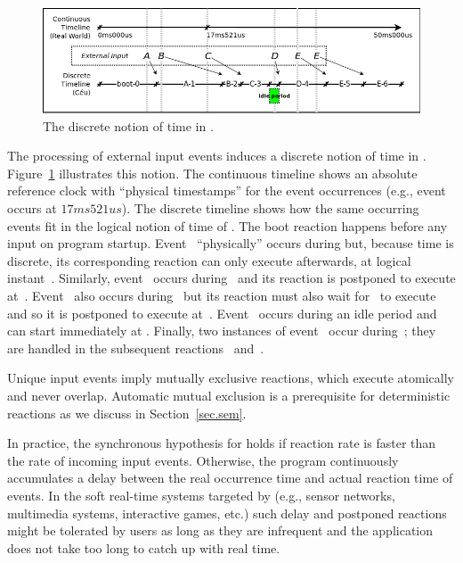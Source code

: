 \begin{figure}[b]
\centering
\includegraphics[width=\columnwidth]{tick}
\caption{The discrete notion of time in \CEU.}
\label{fig.ticks}
\end{figure}

The processing of external input events induces a discrete notion of time in
\CEU.
%
Figure~\ref{fig.ticks} illustrates this notion.
%
The continuous timeline shows an absolute reference clock with ``physical
timestamps'' for the event occurrences (e.g., event~ occurs at
$17ms521us$).
%
The discrete timeline shows how the same occurring events fit in the logical
notion of time of \CEU.
%
The boot reaction  happens before any input on program startup.
%
Event~ ``physically'' occurs during  but, because time
is discrete, its corresponding reaction can only execute afterwards, at
logical instant~.
%
Similarly, event~ occurs during~ and its reaction is
postponed to execute at~.
%
Event~ also occurs during~ but its reaction must also wait
for~ to execute and so it is postponed to execute at~.
%
Event~ occurs during an idle period and can start immediately at
.
%
Finally, two instances of event~ occur during~; they are
handled in the subsequent reactions~ and~.

Unique input events imply mutually exclusive reactions, which execute
atomically and never overlap.
%
Automatic mutual exclusion is a prerequisite for deterministic reactions as
we discuss in Section~\ref{sec.sem}.
%

In practice, the synchronous hypothesis for \CEU holds if reaction rate is
faster than the rate of incoming input events.
%
Otherwise, the program continuously accumulates a delay between the real
occurrence time and actual reaction time of events.
%
In the soft real-time systems targeted by \CEU (e.g., sensor networks,
multimedia systems, interactive games, etc.) such delay and postponed
reactions might be tolerated by users as long as they are infrequent and the
application does not take too long to catch up with real time.

